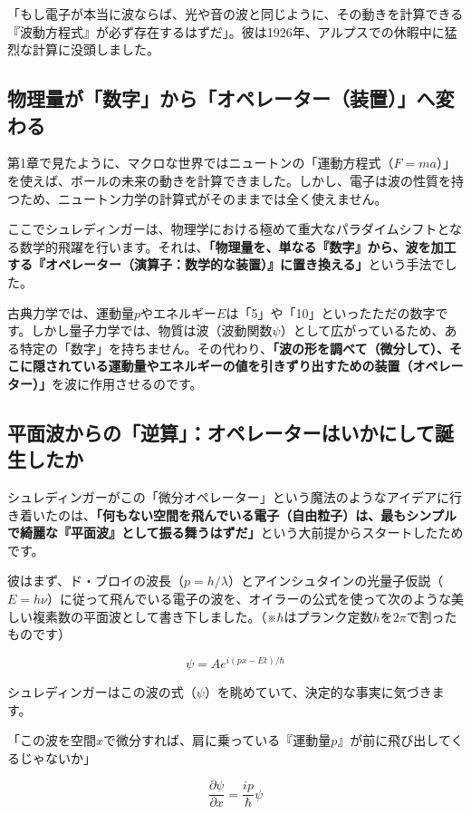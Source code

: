 「もし電子が本当に波ならば、光や音の波と同じように、その動きを計算できる『波動方程式』が必ず存在するはずだ」。彼は1926年、アルプスでの休暇中に猛烈な計算に没頭しました。

\subsection{物理量が「数字」から「オペレーター（装置）」へ変わる}

第1章で見たように、マクロな世界ではニュートンの「運動方程式（\(F=ma\)）」を使えば、ボールの未来の動きを計算できました。しかし、電子は波の性質を持つため、ニュートン力学の計算式がそのままでは全く使えません。

ここでシュレディンガーは、物理学における極めて重大なパラダイムシフトとなる数学的飛躍を行います。それは、\textbf{「物理量を、単なる『数字』から、波を加工する『オペレーター（演算子：数学的な装置）』に置き換える」}という手法でした。

古典力学では、運動量\(p\)やエネルギー\(E\)は「5」や「10」といったただの数字です。しかし量子力学では、物質は波（波動関数\(\psi\)）として広がっているため、ある特定の「数字」を持ちません。その代わり、\textbf{「波の形を調べて（微分して）、そこに隠されている運動量やエネルギーの値を引きずり出すための装置（オペレーター）」}を波に作用させるのです。

\subsection{平面波からの「逆算」：オペレーターはいかにして誕生したか}

シュレディンガーがこの「微分オペレーター」という魔法のようなアイデアに行き着いたのは、\textbf{「何もない空間を飛んでいる電子（自由粒子）は、最もシンプルで綺麗な『平面波』として振る舞うはずだ」}という大前提からスタートしたためです。

彼はまず、ド・ブロイの波長（\(p = h/\lambda\)）とアインシュタインの光量子仮説（\(E = h\nu\)）に従って飛んでいる電子の波を、オイラーの公式を使って次のような美しい複素数の平面波として書き下しました。（※\(\hbar\)はプランク定数\(h\)を\(2\pi\)で割ったものです）

\[\psi = A e^{i(px - Et)/\hbar}\]

シュレディンガーはこの波の式（\(\psi\)）を眺めていて、決定的な事実に気づきます。

「この波を空間\(x\)で微分すれば、肩に乗っている『運動量\(p\)』が前に飛び出してくるじゃないか」

\[\frac{\partial \psi}{\partial x} = \frac{ip}{\hbar} \psi\]

